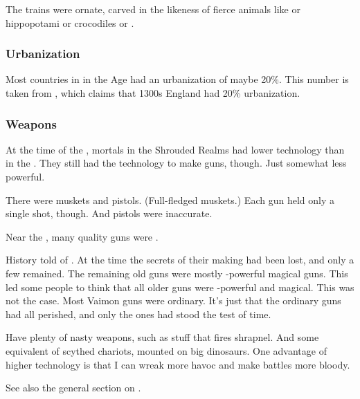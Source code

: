 The trains were ornate, carved in the likeness of fierce animals like \saurians or hippopotami or crocodiles or \dragons. 





\subsubsection{Urbanization}
Most countries in \Azmith in the \Scatha Age had an urbanization of maybe 20\%. 
This number is taken from \cite{DerekKeene:FeedingMedievalEuropeanCities}, which claims that 1300s England had 20\% urbanization. 





\subsubsection{Weapons}
At the time of the \thirdbanewar, mortals in the Shrouded Realms had lower technology than in the \VaimonCaliphate. 
They still had the technology to make guns, though. 
Just somewhat less powerful. 

There were muskets and pistols. 
(Full-fledged muskets.) 
Each gun held only a single shot, though. 
And pistols were inaccurate. 

Near the \thirdbanewar, many quality guns were . 

History told of . 
At the time the secrets of their making had been lost, and only a few remained. 
The remaining old guns were mostly \uber-powerful magical guns. 
This led some people to think that all older guns were \uber-powerful and magical. 
This was not the case. 
Most Vaimon guns were ordinary. 
It's just that the ordinary guns had all perished, and only the \uber{} ones had stood the test of time. 

Have plenty of nasty weapons, such as stuff that fires shrapnel.
And some equivalent of scythed chariots, mounted on big dinosaurs. 
One advantage of higher technology is that I can wreak more havoc and make battles more bloody. 

See also the general section on . 



